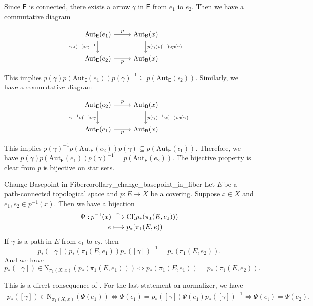 \documentclass{report}
\begin{document}
\begin{prf}
	Since $\mathsf{E}$ is connected, there exists a arrow $\gamma$ in $\mathsf{E}$ from $e_1$ to $e_2$. Then we have a commutative diagram
	\begin{center}
		\[
			\begin{tikzcd}[ampersand replacement=\&]
				\mathrm{Aut}_\mathsf{E}(e_1) \arrow[r, "p"] \arrow[d, "\gamma\circ(-)\circ\gamma^{-1}"'] \& \mathrm{Aut}_\mathsf{B}(x) \arrow[d, "p(\gamma)\circ(-)\circ p(\gamma)^{-1}"] \\
				\mathrm{Aut}_\mathsf{E}(e_2) \arrow[r, "p"'] \& \mathrm{Aut}_\mathsf{B}(x)
			\end{tikzcd}
		\]
	\end{center}
	This implies $ p(\gamma)p(\mathrm{Aut}_\mathsf{E}(e_1))p(\gamma)^{-1}\subseteq p(\mathrm{Aut}_\mathsf{E}(e_2))$.
	Similarly, we have a commutative diagram
	\begin{center}
		\[
			\begin{tikzcd}[ampersand replacement=\&]
				\mathrm{Aut}_\mathsf{E}(e_2) \arrow[r, "p"] \arrow[d, "\gamma^{-1}\circ(-)\circ\gamma"'] \& \mathrm{Aut}_\mathsf{B}(x) \arrow[d, "p(\gamma)^{-1}\circ(-)\circ p(\gamma)"] \\
				\mathrm{Aut}_\mathsf{E}(e_1) \arrow[r, "p"'] \& \mathrm{Aut}_\mathsf{B}(x)
			\end{tikzcd}
		\]
	\end{center}
	This implies $ p(\gamma)^{-1}p(\mathrm{Aut}_\mathsf{E}(e_2))p(\gamma)\subseteq p(\mathrm{Aut}_\mathsf{E}(e_1))$. Therefore, we have  $ p(\gamma)p(\mathrm{Aut}_\mathsf{E}(e_1))p(\gamma)^{-1}= p(\mathrm{Aut}_\mathsf{E}(e_2))$. The bijective property is clear from $p$ is bijective on star sets.
\end{prf}

\begin{corollary}{Change Basepoint in Fiber}{corollary_change_basepoint_in_fiber}
	Let $E$ be a path-connected topological space and $p:E\to X$ be a covering. Suppose $x\in X$ and $e_1,e_2\in p^{-1}(x)$. Then we have a bijection
	\begin{align*}
		\Psi:p^{-1}(x) & \xlongrightarrow{\sim} \mathrm{Cl}(p_*(\pi_1(E,e_1))) \\
		e              & \longmapsto p_*(\pi_1(E,e))
	\end{align*}
	If $\gamma$ is a path in $E$ from $e_1$ to $e_2$, then
	$$
		p_*([\gamma])p_*(\pi_1(E,e_1))p_*([\gamma])^{-1}=p_*(\pi_1(E,e_2)).
	$$
	And we have
	$$
		p_*([\gamma])\in\mathrm{N}_{\pi_1(X,x)}(p_*(\pi_1(E,e_1)))\iff p_*(\pi_1(E,e_1))=p_*(\pi_1(E,e_2)).
	$$
\end{corollary}
\begin{prf}
	This is a direct consequence of . For the last statement on normalizer, we have
	\begin{align*}
		p_*([\gamma])\in\mathrm{N}_{\pi_1(X,x)}(\Psi(e_1))\iff \Psi(e_1)=p_*([\gamma])\Psi(e_1)p_*([\gamma])^{-1} \iff \Psi(e_1)=\Psi(e_2).
	\end{align*}

\end{prf}
\end{document}
